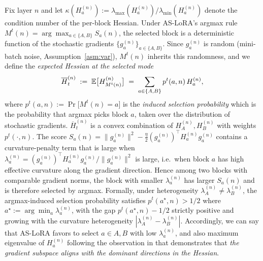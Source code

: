 Fix layer $n$ and let $\kappa(H_a^{(n)}):=\lambda_{\max}(H_a^{(n)})/\lambda_{\min}(H_a^{(n)})$ denote the condition number of the per-block Hessian. Under AS-LoRA's argmax rule $M^t(n) = \arg\max_{a\in\{A,B\}} S_a(n)$, the selected block is a deterministic function of the stochastic gradients $\{g_a^{(n)}\}_{a\in\{A,B\}}$. Since $g_a^{(n)}$ is random (mini-batch noise, Assumption~\ref{asm:var}), $M^t(n)$ inherits this randomness, and we define the \emph{expected Hessian at the selected mode}
\begin{equation}
\overline H_t^{(n)} \;:=\; \mathbb{E}\bigl[H_{M^t(n)}^{(n)}\bigr] \;=\; \sum_{a\in\{A,B\}} p^t(a,n)\,H_a^{(n)},
\end{equation}
where $p^t(a,n) := \Pr\bigl[M^t(n) = a\bigr]$ is the \emph{induced selection probability} which is the probability that argmax picks block $a$, taken over the distribution of stochastic gradients. $\overline H_t^{(n)}$ is a convex combination of $H_A^{(n)}, H_B^{(n)}$ with weights $p^t(\cdot, n)$. The score $S_a(n)=\|g_a^{(n)}\|^2-\tfrac{\eta}{2}(g_a^{(n)})^\top H_a^{(n)} g_a^{(n)}$ contains a curvature-penalty term that is large when $\lambda_a^{(n)}=(g_a^{(n)})^\top H_a^{(n)}g_a^{(n)}/\|g_a^{(n)}\|^2$ is large, i.e.\ when block $a$ has high effective curvature along the gradient direction. Hence among two blocks with comparable gradient norms, the block with smaller $\lambda_a^{(n)}$ has larger $S_a(n)$ and is therefore selected by argmax. Formally, under heterogeneity $\lambda_A^{(n)}\ne\lambda_B^{(n)}$, the argmax-induced selection probability satisfies $p^t(a^\star,n)>1/2$ where $a^\star:=\arg\min_a\lambda_a^{(n)}$, with the gap $p^t(a^\star,n)-1/2$ strictly positive and growing with the curvature heterogeneity $|\lambda_A^{(n)}-\lambda_B^{(n)}|$. Accordingly, we can say that AS-LoRA favors to select $a\in{A,B}$ with low $\lambda_{a}^{(n)}$, and also maximum eigenvalue of $H_{a}^{(n)}$ following the observation in \cite{jaiswal2025low} that demonstrates that \emph{the gradient subspace aligns with the dominant directions in the Hessian}.



